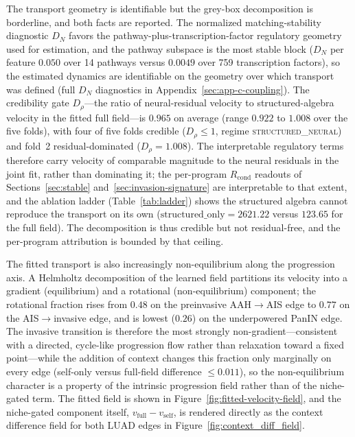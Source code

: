 The transport geometry is identifiable but the grey-box decomposition is borderline, and both facts are reported. The normalized matching-stability diagnostic $D_N$ favors the pathway-plus-transcription-factor regulatory geometry used for estimation, and the pathway subspace is the most stable block ($D_N$ per feature $0.050$ over 14 pathways versus $0.0049$ over 759 transcription factors), so the estimated dynamics are identifiable on the geometry over which transport was defined (full $D_N$ diagnostics in Appendix~\ref{sec:app-c-coupling}). The credibility gate $D_{\rho}$---the ratio of neural-residual velocity to structured-algebra velocity in the fitted full field---is $0.965$ on average (range $0.922$ to $1.008$ over the five folds), with four of five folds credible ($D_{\rho} \leq 1$, regime \textsc{structured\_neural}) and fold~2 residual-dominated ($D_{\rho} = 1.008$). The interpretable regulatory terms therefore carry velocity of comparable magnitude to the neural residuals in the joint fit, rather than dominating it; the per-program $R_{\text{cond}}$ readouts of Sections~\ref{sec:stable} and~\ref{sec:invasion-signature} are interpretable to that extent, and the ablation ladder (Table~\ref{tab:ladder}) shows the structured algebra cannot reproduce the transport on its own ($\text{structured\_only} = 2621.22$ versus $123.65$ for the full field). The decomposition is thus credible but not residual-free, and the per-program attribution is bounded by that ceiling.

The fitted transport is also increasingly non-equilibrium along the progression axis. A Helmholtz decomposition of the learned field partitions its velocity into a gradient (equilibrium) and a rotational (non-equilibrium) component; the rotational fraction rises from $0.48$ on the preinvasive AAH$\rightarrow$AIS edge to $0.77$ on the AIS$\rightarrow$invasive edge, and is lowest ($0.26$) on the underpowered PanIN edge. The invasive transition is therefore the most strongly non-gradient---consistent with a directed, cycle-like progression flow rather than relaxation toward a fixed point---while the addition of context changes this fraction only marginally on every edge (self-only versus full-field difference $\leq 0.011$), so the non-equilibrium character is a property of the intrinsic progression field rather than of the niche-gated term. The fitted field is shown in Figure~\ref{fig:fitted-velocity-field}, and the niche-gated component itself, $v_{\text{full}}-v_{\text{self}}$, is rendered directly as the context difference field for both LUAD edges in Figure~\ref{fig:context_diff_field}.

